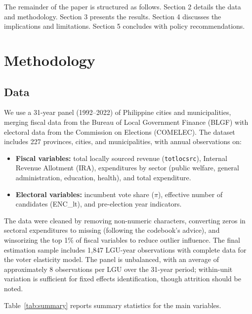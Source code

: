 \documentclass[twocolumn]{article}
\begin{document}
The remainder of the paper is structured as follows. Section 2 details the data and methodology. Section 3 presents the results. Section 4 discusses the implications and limitations. Section 5 concludes with policy recommendations.

\section{Methodology}

\subsection{Data}

We use a 31-year panel (1992--2022) of Philippine cities and municipalities, merging fiscal data from the Bureau of Local Government Finance (BLGF) with electoral data from the Commission on Elections (COMELEC). The dataset includes 227 provinces, cities, and municipalities, with annual observations on:

\begin{itemize}
\item \textbf{Fiscal variables:} total locally sourced revenue (\texttt{totlocsrc}), Internal Revenue Allotment (IRA), expenditures by sector (public welfare, general administration, education, health), and total expenditure.
\item \textbf{Electoral variables:} incumbent vote share ($\pi$), effective number of candidates (ENC\_lt), and pre-election year indicators.
\end{itemize}

The data were cleaned by removing non-numeric characters, converting zeros in sectoral expenditures to missing (following the codebook's advice), and winsorizing the top 1\% of fiscal variables to reduce outlier influence. The final estimation sample includes 1,847 LGU-year observations with complete data for the voter elasticity model. The panel is unbalanced, with an average of approximately 8 observations per LGU over the 31-year period; within-unit variation is sufficient for fixed effects identification, though attrition should be noted.

Table~\ref{tab:summary} reports summary statistics for the main variables.
\end{document}
